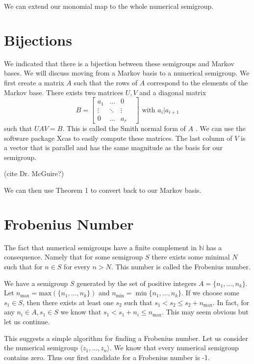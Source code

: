 \documentclass[11pt]{amsart}
\theoremstyle{plain}
\theoremstyle{definition}
\begin{document}
We can extend our monomial map to the whole numerical semigroup.

\section{Bijections}
We indicated that there is a bijection between these semigroups and Markov
bases. We will discuss moving from a Markov basis to a numerical semigroup. We
first create a matrix $A$ such that the rows of $A$ correspond to the elements
of the Markov base. There exists two matrices $U,V$ and a diagonal matrix
\[B=
\left[\begin{array}{cccc}
  a_1&\dots&0\\
  \vdots&\ddots&\vdots\\
  0&\dots&a_r&
\end{array}\right]
\text{ with }a_i|a_{i+1}\]
such that $UAV=B$. This is called the Smith normal form of $A$ \cite{adkins}.
We can use the software package Xcas\cite{xcas} to easily compute these matrices. The last
column of $V$ is a vector that is parallel and has the same magnitude as the
basis for our semigroup.

(cite Dr. McGuire?)

We can then use Theorem 1 to convert back to our Markov basis.
\section{Frobenius Number}
The fact that numerical semigroups have a finite complement in $\mathbb{N}$ has
a consequence. Namely that for some semigroup $S$ there exists some minimal $N$
such that for $n\in S$ for every  $n>N$. This number is called the Frobenius
number.

We have a semigroup $S$ generated by the set of positive integers
$A=\{ n_1,\dots,n_k\}$. Let $n_\text{max}=\text{max}(\{n_1,\dots,n_k\})$ and
$n_{\min{}}=\min{\{n_1,\dots,n_k\}}$. If we choose some $s_1\in S$, then
there exists at least one $s_2$ such that $s_1<s_2\le s_2+n_{\max{}}$. In
fact, for any $n_i\in A,s_1\in S$ we know that
$s_1<s_1+n_i\le n_\text{max}$. This may seem obvious but let us continue.

This suggests a simple algorithm for finding a Frobenius number. Let us consider the numerical semigroup $\langle z_1,\dots,z_n\rangle$. We know that every numerical semigroup contains zero. Thus our first candidate for a Frobenius number is -1.
\end{document}
